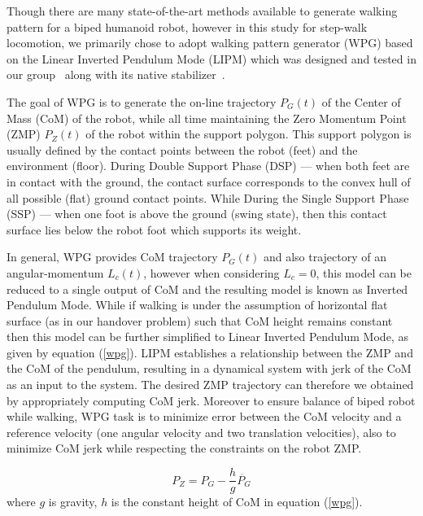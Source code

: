Though there are many state-of-the-art methods available to generate walking pattern for a biped humanoid robot, however in this study for step-walk locomotion, we primarily chose to adopt walking pattern generator (WPG) based on the Linear Inverted Pendulum Mode (LIPM) which was designed and tested in our group~\cite{ kajita20013d, caron2016humanoids} along with its native stabilizer~\cite{kajita2010biped, caron2018stair}. 

The goal of WPG is to generate the on-line trajectory $P_G(t)$ of the Center of Mass (CoM) of the robot, while all time maintaining the Zero Momentum Point (ZMP) $P_Z(t)$ of the robot within the support polygon. This support polygon is usually defined by the contact points between the robot (feet) and the environment (floor). During Double Support Phase (DSP) --- when both feet are in contact with the ground, the contact surface corresponds to the convex hull of all possible (flat) ground contact points. While During the Single Support Phase (SSP) --- when one foot is above the ground (swing state), then this contact surface lies below the robot foot which supports its weight. 

In general, WPG provides CoM trajectory $P_G(t)$ and also trajectory of an angular-momentum $L_c(t)$, however when considering $L_c = 0$, this model can be reduced to a single output of CoM and the resulting model is known as Inverted Pendulum Mode. While if walking is under the assumption of horizontal flat surface (as in our handover problem) such that CoM height remains constant then this model can be further simplified to Linear Inverted Pendulum Mode, as given by equation (\ref{wpg}). LIPM establishes a relationship between the ZMP and the CoM of the pendulum, resulting in a dynamical system with jerk of the CoM as an input to the system. The desired ZMP trajectory can therefore we obtained by appropriately computing CoM jerk. Moreover to ensure balance of biped robot while walking, WPG task is to minimize error between the CoM velocity and a reference velocity (one angular velocity and two translation velocities), also to minimize CoM jerk while respecting the constraints on the robot ZMP.


\begin{equation}\label{wpg}
P_Z =  P_G - \frac{h}{g} \ddot{P_G}
\end{equation}
where $g$ is gravity, $h$ is the constant height of CoM in equation (\ref{wpg}).


